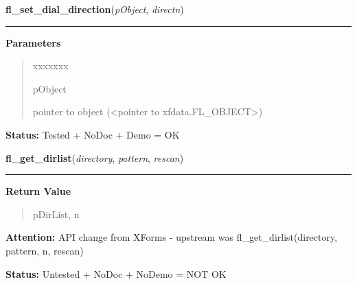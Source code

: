     \label{xformslib:library:fl_set_dial_direction}

    \vspace{0.5ex}

\hspace{.8\funcindent}\begin{boxedminipage}{\funcwidth}

    \raggedright \textbf{fl\_set\_dial\_direction}(\textit{pObject}, \textit{directn})

    \vspace{-1.5ex}

    \rule{\textwidth}{0.5\fboxrule}
\setlength{\parskip}{2ex}
\setlength{\parskip}{1ex}
      \textbf{Parameters}
      \vspace{-1ex}

      \begin{quote}
        \begin{Ventry}{xxxxxxx}

          \item[pObject]

          pointer to object ({\textless}pointer to 
          xfdata.FL\_OBJECT{\textgreater})

        \end{Ventry}

      \end{quote}

\textbf{Status:} Tested + NoDoc + Demo = OK



    \end{boxedminipage}

    \label{xformslib:library:fl_get_dirlist}

    \vspace{0.5ex}

\hspace{.8\funcindent}\begin{boxedminipage}{\funcwidth}

    \raggedright \textbf{fl\_get\_dirlist}(\textit{directory}, \textit{pattern}, \textit{rescan})

    \vspace{-1.5ex}

    \rule{\textwidth}{0.5\fboxrule}
\setlength{\parskip}{2ex}
\setlength{\parskip}{1ex}
      \textbf{Return Value}
    \vspace{-1ex}

      \begin{quote}
      pDirList, n

      \end{quote}

\textbf{Attention:} API change from XForms - upstream was fl\_get\_dirlist(directory, pattern, 
n, rescan)



\textbf{Status:} Untested + NoDoc + NoDemo = NOT OK



    \end{boxedminipage}

